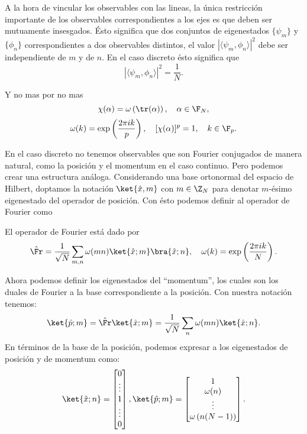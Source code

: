   A la hora de vincular los observables con las lineas, la
  única restricción importante de los observables
  correspondientes a los ejes es que deben ser mutuamente
  insesgados. Ésto significa que dos conjuntos de
  eigenestados $\{\psi_m\}$ y $\{\phi_n\}$ correspondientes
  a dos observables distintos, el valor $|\langle \psi_m,
  \phi_n \rangle|^2$ debe ser independiente de $m$ y de $n$.
  En el caso discreto ésto significa que
  \[
    |\langle \psi_m, \phi_n \rangle|^2 = \frac{1}{N}.
  \] 

 
  Y no mas por no mas
  \[
    \chi(\alpha)
    = \omega\left( \tr(\alpha) \right),
    \quad \alpha \in \F_N,
  \] 
  \[
    \omega(k)
    = \exp\left( \frac{2\pi i k}{p} \right),
    \quad [\chi(\alpha)]^{p} = 1, 
    \quad k \in \F_p.
  \] 

  En el caso discreto no tenemos observables que son Fourier
  conjugados de manera natural, como la posición y el
  momentum en el caso continuo. Pero podemos crear una
  estructura análoga. Considerando una base ortonormal del
  espacio de Hilbert, doptamos la notación $\ket{\hat{x},
  m}$ con $m \in \Z_N$ para denotar $m$-ésimo eigenestado
  del operador de posición. Con ésto podemos definir al
  operador de Fourier como
  \begin{definition}
    El operador de Fourier está dado por
    \begin{equation}
     \hat{\Fr}
     = \frac{1}{\sqrt{N}} 
     \sum_{m,n}^{} \omega(mn) \ket{\hat{x}; m} \bra{\hat{x};
     n},
     \quad \omega(k)
     = \exp \left( \frac{2\pi i k}{N} \right).
    \end{equation}
  \end{definition}
  Ahora podemos definir los eigenestados del ``momentum'',
  los cuales son los duales de Fourier a la base
  correspondiente a la posición. Con nuestra notación
  tenemos:
  \begin{equation}
    \ket{\hat{p}; m}
    =\hat{\Fr} \ket{\hat{x}; m}
    = \frac{1}{\sqrt{N}} \sum_{n}^{} \omega(mn)
    \ket{\hat{x};n}.
  \end{equation}
  En términos de la base de la posición, podemos expresar a
  los eigenestados de posición y de momentum como:
  \begin{equation}
    \ket{\hat{x};n}
    = \begin{bmatrix}
      0 \\
      \vdots \\
      1 \\
      \vdots \\
      0
    \end{bmatrix},
    \ket{\hat{p};m}
    = \begin{bmatrix}
      1 \\
      \omega(n) \\
      \vdots \\
      \omega\left( n(N-1) \right) 
    \end{bmatrix}.
  \end{equation}

